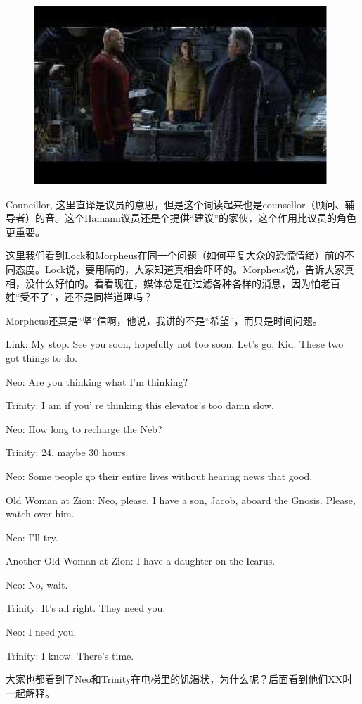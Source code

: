 \documentclass{ctexart}
\newenvironment{myquote}{\color{green} \setlength{\leftskip}{6em} \setlength{\rightskip}{4em} \setlength{\parindent}{-2em}}{\par}
\begin{document}
\begin{figure}[htb]
\centering
\includegraphics[width=0.5\linewidth]{fig/read_reloaded-37}
\end{figure}

Councillor, 这里直译是议员的意思，但是这个词读起来也是counsellor（顾问、辅导者）的音。这个Hamann议员还是个提供“建议”的家伙，这个作用比议员的角色更重要。

这里我们看到Lock和Morpheus在同一个问题（如何平复大众的恐慌情绪）前的不同态度。Lock说，要用瞒的，大家知道真相会吓坏的。Morpheus说，告诉大家真相，没什么好怕的。看看现在，媒体总是在过滤各种各样的消息，因为怕老百姓“受不了”，还不是同样道理吗？

Morpheus还真是“坚”信啊，他说，我讲的不是“希望”，而只是时间问题。

\begin{myquote}
Link: My stop. See you soon, hopefully not too soon. Let's go, Kid. These two got things to do.

Neo: Are you thinking what I'm thinking?

Trinity: I am if you' re thinking this elevator's too damn slow.

Neo: How long to recharge the Neb?

Trinity: 24, maybe 30 hours.

Neo: Some people go their entire lives without hearing news that good.

Old Woman at Zion: Neo, please. I have a son, Jacob, aboard the Gnosis. Please, watch over him.

Neo: I'll try.

Another Old Woman at Zion: I have a daughter on the Icarus.

Neo: No, wait.

Trinity: It's all right. They need you.

Neo: I need you.

Trinity: I know. There's time.
\end{myquote}

大家也都看到了Neo和Trinity在电梯里的饥渴状，为什么呢？后面看到他们XX时一起解释。
\end{document}

